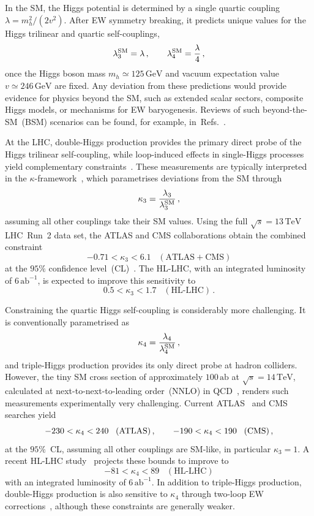 \documentclass{SciPost}
\def\beq{\begin{equation}}
\def\eeq{\end{equation}}
\begin{document}
In the SM, the Higgs potential is determined by a single quartic coupling $\lambda = m_h^2/(2v^2)$. After EW symmetry breaking, it predicts unique values for the Higgs trilinear and quartic self-couplings,
\beq \label{eq:SM67}
\lambda_3^{\rm SM} = \lambda \,, \qquad
\lambda_4^{\rm SM} = \frac{\lambda}{4} \,,
\eeq
once the Higgs boson mass $m_h\simeq125\,\mathrm{GeV}$ and vacuum expectation value $v\simeq246\,\mathrm{GeV}$ are fixed. Any deviation from these predictions would provide evidence for physics beyond the SM, such as extended scalar sectors, composite Higgs models, or mechanisms for EW baryogenesis. Reviews of such beyond-the-SM~(BSM) scenarios can be found, for example, in~Refs.~\cite{DiMicco:2019ngk,Durieux:2022hbu}.

At the LHC, double-Higgs production provides the primary direct probe of the Higgs trilinear self-coupling, while loop-induced effects in single-Higgs processes yield complementary constraints~\cite{Gorbahn:2016uoy,Degrassi:2016wml,Bizon:2016wgr,Maltoni:2017ims,Gorbahn:2019lwq,Haisch:2021hvy,Gao:2023bll,Haisch:2024nzv,Ghosh:2025fma}. These measurements are typically interpreted in the $\kappa$-framework~\cite{LHCHiggsCrossSectionWorkingGroup:2012nn,LHCHiggsCrossSectionWorkingGroup:2013rie,LHCHiggsCrossSectionWorkingGroup:2016ypw}, which parametrises deviations from the SM through
\beq \label{eq:kappa3}
\kappa_3 = \frac{\lambda_3}{\lambda_3^{\rm SM}} \,,
\eeq
assuming all other couplings take their SM values. Using the full $\sqrt{s}=13\,\mathrm{TeV}$ LHC~Run~2 data set, the ATLAS and CMS collaborations obtain the combined constraint
\beq \label{eq:kappa3bound}
-0.71 < \kappa_3 < 6.1\;\;\;(\text{ATLAS}+\text{CMS})
\eeq
at the $95\%$ confidence level~(CL)~\cite{CMS:2026nuu}. The HL-LHC, with an integrated luminosity of $6\,\mathrm{ab}^{-1}$, is expected to improve this sensitivity to
\beq
0.5 < \kappa_3 < 1.7\;\;\;(\text{HL-LHC})\,.
\eeq

Constraining the quartic Higgs self-coupling is considerably more challenging. It is conventionally parametrised as
\beq \label{eq:kappa4}
\kappa_4 = \frac{\lambda_4}{\lambda_4^{\rm SM}} \,,
\eeq
and triple-Higgs production provides its only direct probe at hadron colliders. However, the tiny SM cross section of approximately $100\,\mathrm{ab}$ at $\sqrt{s}=14\,\mathrm{TeV}$, calculated at next-to-next-to-leading order~(NNLO) in QCD~\cite{deFlorian:2019app}, renders such measurements experimentally very challenging. Current ATLAS~\cite{ATLAS:2024xcs} and CMS~\cite{CMS-PAS-HIG-24-012} searches yield
\beq \label{eq:kappa4bounds}
-230 < \kappa_4 < 240 \;\;\;(\rm ATLAS) \,, \qquad
-190 < \kappa_4 < 190 \;\;\;(\rm CMS) \,,
\eeq
at the $95\%$~CL, assuming all other couplings are SM-like, in particular $\kappa_3=1$. A recent HL-LHC study~\cite{Ding:2026qto} projects these bounds to improve to
\beq
-81 < \kappa_4 < 89\;\;\;(\text{HL-LHC})
\eeq
with an integrated luminosity of $6\,\mathrm{ab}^{-1}$. In addition to triple-Higgs production, double-Higgs production is also sensitive to $\kappa_4$ through two-loop EW corrections~\cite{Bizon:2018syu,Borowka:2018pxx,Li:2024iio,Ding:2026qto}, although these constraints are generally weaker.
\end{document}
